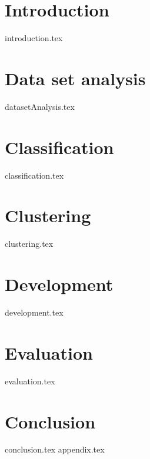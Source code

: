 \documentclass[
    nolot,
    color,   %
	table,   %
    twoside, %
]{fithesis/fithesis3}
\begin{document}
  \pagestyle{plain}
  
  \chapter{Introduction}
  {introduction.tex}
  \chapter{Data set analysis}
  {datasetAnalysis.tex}
  \chapter{Classification}
  {classification.tex}
  \chapter{Clustering}
  {clustering.tex}
  \chapter{Development}
  {development.tex}  
 \chapter{Evaluation}
  {evaluation.tex}  
  \chapter{Conclusion}
  {conclusion.tex}
  {}
  {appendix.tex}
\end{document}
